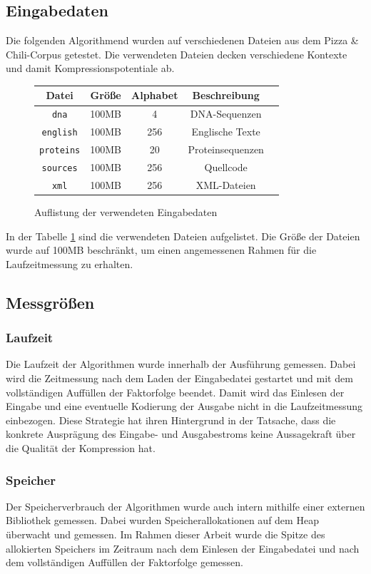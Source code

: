 \subsection{Eingabedaten}
Die folgenden Algorithmend wurden auf verschiedenen Dateien aus dem Pizza \& Chili-Corpus getestet. Die verwendeten Dateien decken verschiedene Kontexte und damit
Kompressionspotentiale ab.
\begin{figure}
    \centering
    \caption{Auflistung der verwendeten Eingabedaten}
    \label{inputdata}
    \begin{tabular}{|c|c|c|c|c|}
        \hline
        \textbf{Datei} & \textbf{Größe} & \textbf{Alphabet} & \textbf{Beschreibung} \\
        \hline
        \texttt{dna} & 100MB & 4 & DNA-Sequenzen \\
        \hline
        \texttt{english} & 100MB & 256 & Englische Texte \\
        \hline
        \texttt{proteins} & 100MB & 20 & Proteinsequenzen \\
        \hline
        \texttt{sources} & 100MB & 256 & Quellcode \\
        \hline
        \texttt{xml} & 100MB & 256 & XML-Dateien \\
        \hline
    \end{tabular}
\end{figure}
In der Tabelle \ref{inputdata} sind die verwendeten Dateien aufgelistet. Die Größe der Dateien wurde auf 100MB beschränkt, um einen angemessenen Rahmen für die 
Laufzeitmessung zu erhalten.

\subsection{Messgrößen}

\subsubsection{Laufzeit}
Die Laufzeit der Algorithmen wurde innerhalb der Ausführung gemessen. Dabei wird die Zeitmessung nach dem Laden der Eingabedatei gestartet und mit dem vollständigen
Auffüllen der Faktorfolge beendet. Damit wird das Einlesen der Eingabe und eine eventuelle Kodierung der Ausgabe nicht in die Laufzeitmessung einbezogen. Diese Strategie
hat ihren Hintergrund in der Tatsache, dass die konkrete Ausprägung des Eingabe- und Ausgabestroms keine Aussagekraft über die Qualität der Kompression hat.

\subsubsection{Speicher}
Der Speicherverbrauch der Algorithmen wurde auch intern mithilfe einer externen Bibliothek gemessen. Dabei wurden Speicherallokationen auf dem Heap überwacht und 
gemessen. Im Rahmen dieser Arbeit wurde die Spitze des allokierten Speichers im Zeitraum nach dem Einlesen der Eingabedatei und nach dem vollständigen Auffüllen der
Faktorfolge gemessen.

